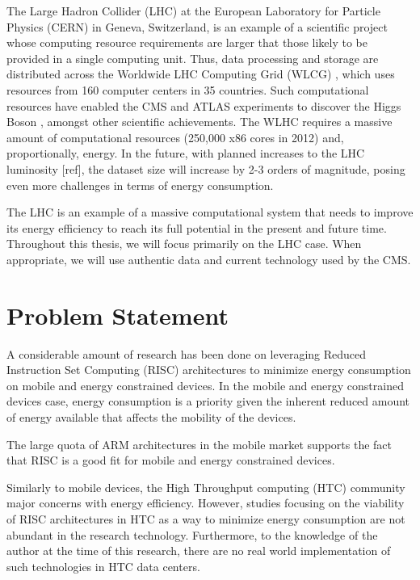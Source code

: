 The Large Hadron Collider (LHC) \cite{LHC} at the European Laboratory for Particle
Physics (CERN) in Geneva, Switzerland, is an example of a scientific project
whose computing resource requirements are larger that those likely to be provided 
in a single computing unit. Thus, data processing and storage are distributed across 
the Worldwide LHC
Computing Grid (WLCG) \cite{WLCG}, which uses resources from 160 computer centers in 35
countries. Such computational resources have enabled the CMS \cite{CMS} and ATLAS \cite{ATLAS}
experiments to discover the Higgs Boson \cite{HIGGS2} \cite{HIGGS1}, amongst other scientific 
achievements. 
The WLHC requires a massive amount of computational resources 
(250,000 x86 cores in 2012) and,
proportionally, energy. In the future, with planned increases to the LHC
luminosity [ref], the dataset size will increase by 2-3 orders of magnitude,
posing even more challenges in terms of energy consumption.

The LHC is an example of a massive computational system that needs to improve its
energy efficiency to reach its full potential in the present and future time.
Throughout this thesis, we will focus primarily on the LHC case. When
appropriate, we will use authentic data and current technology used by the CMS.  


\section{Problem Statement}
A considerable amount of research has been done on leveraging Reduced
Instruction Set Computing (RISC) architectures to minimize energy consumption on 
mobile and energy constrained devices. In the mobile and energy constrained devices case, energy consumption is a
priority given the inherent reduced amount of energy available that affects the mobility of the devices. 

The large quota of ARM architectures in the mobile market supports the fact that
RISC is a good fit for mobile and energy constrained devices.


Similarly to mobile devices, the High Throughput computing (HTC) community major concerns with energy efficiency. However, studies focusing on the viability 
of RISC architectures in HTC as a way to minimize energy consumption are not
abundant in the research technology. Furthermore, to the knowledge of the
author at the time of this research, there are no real world implementation of such technologies in 
HTC data centers.



